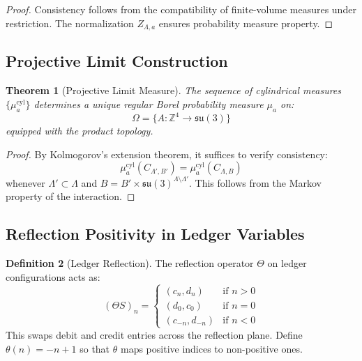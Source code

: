 \documentclass[11pt]{article}
\numberwithin{equation}{section}
\newtheorem{theorem}{Theorem}[section]
\theoremstyle{definition}
\newtheorem{definition}[theorem]{Definition}
\theoremstyle{remark}
\begin{document}
\begin{proof}
Consistency follows from the compatibility of finite-volume measures under restriction. The normalization $Z_{\Lambda,a}$ ensures probability measure property.
\end{proof}

\subsection{Projective Limit Construction}

\begin{theorem}[Projective Limit Measure]
The sequence of cylindrical measures $\{\mu_a^{\text{cyl}}\}$ determines a unique regular Borel probability measure $\mu_a$ on:
\begin{equation}
\Omega = \{A : \mathbb{Z}^4 \to \mathfrak{su}(3)\}
\end{equation}
equipped with the product topology.
\end{theorem}

\begin{proof}
By Kolmogorov's extension theorem, it suffices to verify consistency:
\begin{equation}
\mu_a^{\text{cyl}}(C_{\Lambda',B'}) = \mu_a^{\text{cyl}}(C_{\Lambda,B})
\end{equation}
whenever $\Lambda' \subset \Lambda$ and $B = B' \times \mathfrak{su}(3)^{\Lambda \setminus \Lambda'}$. This follows from the Markov property of the interaction.
\end{proof}

\subsection{Reflection Positivity in Ledger Variables}

\begin{definition}[Ledger Reflection]
The reflection operator $\Theta$ on ledger configurations acts as:
\begin{equation}
(\Theta S)_n = \begin{cases}
(c_n, d_n) & \text{if } n > 0 \\
(d_0, c_0) & \text{if } n = 0 \\
(c_{-n}, d_{-n}) & \text{if } n < 0
\end{cases}
\end{equation}
This swaps debit and credit entries across the reflection plane. Define $\theta(n) = -n + 1$ so that $\theta$ maps positive indices to non-positive ones.
\end{definition}
\end{document}
